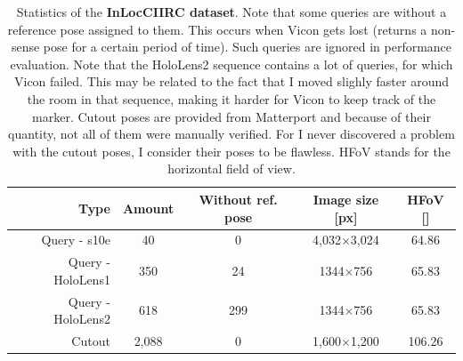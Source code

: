 \documentclass[twoside]{ctuthesis}
\theoremstyle{plain}
\theoremstyle{definition}
\theoremstyle{note}
\begin{document}
\begin{table}[t]
    \centering
    {\footnotesize
	\begin{tabular}{|r||c|c|c|c|}
	\hline
	Type & Amount & Without ref. pose & Image size [px] & HFoV [\degree] \\[1pt]
	\hline
    Query - s10e & 40 & 0 & 4,032$\times$3,024 & 64.86 \\[1pt]
    Query - HoloLens1 & 350 & 24 & 1344$\times$756 & 65.83 \\[1pt]
    Query - HoloLens2 & 618 & 299 & 1344$\times$756 & 65.83 \\[1pt]
	Cutout & 2,088 & 0 & 1,600$\times$1,200 & 106.26 \\[3pt]
	\hline
    \end{tabular}
	\caption[Statistics of the InLocCIIRC dataset]{Statistics of the {\bf InLocCIIRC dataset}. Note that some queries are without a reference pose assigned to them. This occurs when Vicon gets lost (returns a non-sense pose for a certain period of time). Such queries are ignored in performance evaluation. Note that the HoloLens2 sequence contains a lot of queries, for which Vicon failed. This may be related to the fact that I moved slighly faster around the room in that sequence, making it harder for Vicon to keep track of the marker. Cutout poses are provided from Matterport and because of their quantity, not all of them were manually verified. For I never discovered a problem with the cutout poses, I consider their poses to be flawless. HFoV stands for the horizontal field of view.}
	\label{tab:dataset-statistics}
    }
\end{table}
\end{document}
